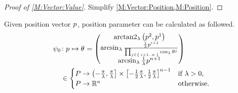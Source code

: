 \documentclass[../methodology.tex]{subfiles}
\begin{document}
\begin{proof}[Proof of \cref{M:Vector:Value}]
    Simplify \cref{M:Vector:Position,M:Position}.
\end{proof}
\begin{lemma}\label{M:Parameter:Value}
    Given position vector \(\tensor{p}{}\), position parameter can be calculated as followed.
    \begin{align*}
        \psi_0
         & \colon\tensor{p}{}\mapsto\tensor{\theta}{}
        =
        \begin{pmatrix}
            \arctantwo_\lambda{\left(\tensor{p}{^2},\tensor{p}{^1}\right)}                                                           \\
            \arcsin_\lambda{\frac{\frac{1}{\lambda}\tensor{p}{^{i+1}}}{\prod_{j\in\Set{i+1..n}}{\cos_\lambda{\tensor{\theta}{^j}}}}} \\
            \arcsin_\lambda{\frac{1}{\lambda}\tensor{p}{^{n+1}}}                                                                     \\
        \end{pmatrix} \\
         & \in
        \begin{cases}
            P\to\left(-\frac{\pi}{\lambda},\frac{\pi}{\lambda}\right]\times\left[-\frac{1}{2}\frac{\pi}{\lambda},\frac{1}{2}\frac{\pi}{\lambda}\right]^{n-1} & \text{if \(\lambda>0\),} \\
            P\to\mathbb{R}^{n}                                                                                                                               & \text{otherwise.}        \\
        \end{cases}
    \end{align*}
\end{lemma}
\end{document}
